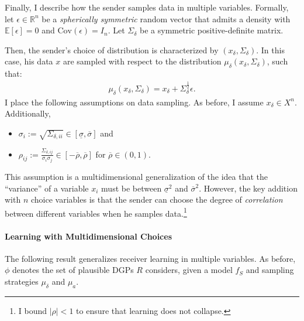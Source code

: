 \documentclass[11pt,dvipsnames]{article}
\newcommand{\Cov}{\mathrm{Cov}}
\begin{document}
Finally, I describe how the sender samples data in multiple variables.
Formally, let $\epsilon \in \mathbb{R}^n$ be a \emph{spherically symmetric} random vector that admits a density with $\mathbb{E}[\epsilon]=0$ and $\Cov(\epsilon) = I_n$.
Let $\Sigma_\delta$ be a symmetric positive-definite matrix.

Then, the sender's choice of distribution is characterized by $(x_\delta,\Sigma_\delta)$.
In this case, his data $x$ are sampled with respect to the distribution $\mu_\delta(x_\delta,\Sigma_\delta)$, such that:
\begin{align*}
\mu_\delta(x_\delta, \Sigma_\delta) = x_\delta + \Sigma_{\delta}^{\frac{1}{2}}\epsilon.
\end{align*}
I place the following assumptions on data sampling.
As before, I assume $x_\delta \in X^n$. Additionally,
\begin{itemize}
\item $\sigma_i := \sqrt{\Sigma_{\delta,ii}} \in [\underline{\sigma},\overline{\sigma}]$ and
\item $\rho_{ij} := \frac{\Sigma_{\delta,ij}}{\sigma_i \sigma_j} \in [-\overline{\rho},\overline{\rho}]$ for $\overline{\rho} \in (0,1)$.
\end{itemize}
This assumption is a multidimensional generalization of the idea that the ``variance'' of a variable $x_i$ must be between $\underline{\sigma}^2$ and $\overline{\sigma}^2$.
However, the key addition with $n$ choice variables is that the sender can choose the degree of \emph{correlation} between different variables when he samples data.\footnote{
I bound $|\rho|<1$ to ensure that learning does not collapse.}

\paragraph{Learning with Multidimensional Choices}
The following result generalizes receiver learning in multiple variables.
As before, $\phi$ denotes the set of plausible DGPs $R$ considers, given a model $f_S$ and sampling strategies $\mu_\delta$ and $\mu_a$.
\end{document}
